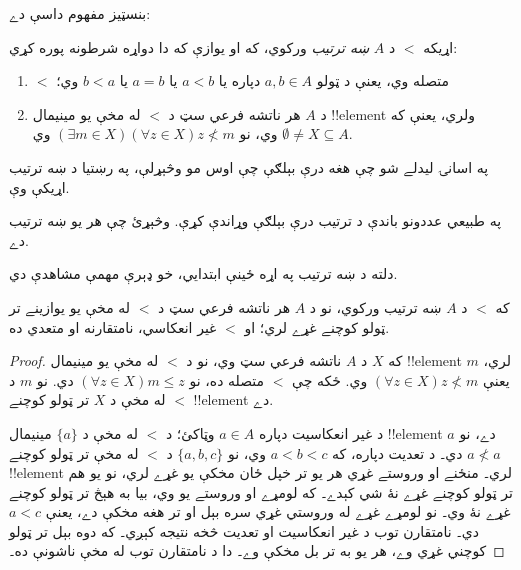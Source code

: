 \documentclass[../../../include/open-logic-section]{subfiles}
\begin{document}

بنسټيز مفهوم داسې دے:

\begin{defn}
اړيکه $<$ د $A$ \emph{ښه ترتيب} ورکوي، که او يوازې که دا دواړه شرطونه پوره کړي:
\begin{enumerate}
	\item $<$ متصله وي، يعنې د ټولو $a, b \in A$ دپاره يا $a < b$
	يا $a = b$ يا $b < a$ وي؛
	\item د $A$ هر ناتشه فرعي سټ د $<$ له مخې يو مينيمال !!{element} ولري،
	يعنې که $\emptyset \neq X \subseteq A$ وي، نو $(\exists m \in
	X)(\forall z \in X)z \nless m$ وي.
\end{enumerate}
\end{defn}

په اسانۍ ليدلے شو چې هغه درې بېلګې چې اوس مو وڅېړلې، په رښتيا
د ښه ترتيب اړيکې وې.

\begin{prob}
 په طبيعي عددونو باندې د ترتيب درې
بېلګې وړاندې کړې. وڅېړئ چې هر يو ښه ترتيب دے.
\end{prob}

دلته د ښه ترتيب په اړه ځينې ابتدايي، خو ډېرې مهمې مشاهدې دي.

\begin{prop}
که $<$ د $A$ ښه ترتيب ورکوي، نو د $A$ هر ناتشه فرعي سټ د $<$ له
مخې يو يوازينے تر ټولو کوچنے غړے لري؛ او $<$ غير انعکاسي، نامتقارنه او متعدي ده.
\end{prop}

\begin{proof}
که $X$ د $A$ ناتشه فرعي سټ وي، نو د $<$ له مخې يو مينيمال
!!{element} $m$ لري، يعنې $(\forall z \in X)z \nless m$ وي.
ځکه چې $<$ متصله ده، نو $(\forall z \in X)m \leq z$ دي.
نو $m$ د $<$ له مخې د $X$ تر ټولو کوچنے !!{element} دے.

د غير انعکاسيت دپاره $a \in A$ وټاکئ؛ د $<$ له مخې د $\{a\}$
مينيمال !!{element} $a$ دے، نو $a \nless a$ دي۔
د تعديت دپاره، که $a < b < c$ وي، نو $\{a, b, c\}$ د
$<$ له مخې تر ټولو کوچنے !!{element} لري۔ منځنے او وروستے
غړي هر يو تر خپل ځان مخکې يو غړے لري، نو يو هم تر ټولو
کوچنے غړے نۀ شي کېدے۔ که لومړے او وروستے يو وي، بيا
به هېڅ تر ټولو کوچنے غړے نۀ وي۔ نو لومړے غړے له وروستي
غړي سره بېل او تر هغه مخکې دے، يعنې $a < c$ دي۔
نامتقارن توب د غير انعکاسيت او تعديت څخه نتيجه کېږي۔
که دوه بېل تر ټولو کوچني غړي وے، هر يو به تر بل مخکې
وے۔ دا د نامتقارن توب له مخې ناشونې ده۔
\end{proof}
\end{document}

